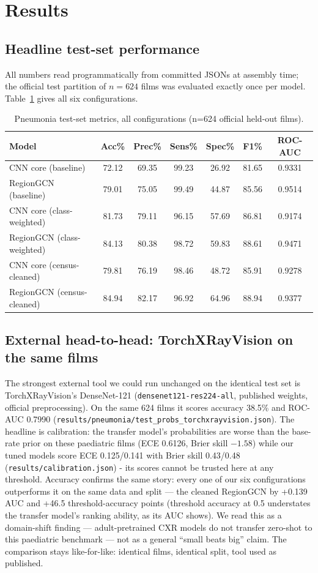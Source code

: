 
\section{Results}
\subsection{Headline test-set performance}
All numbers read programmatically from committed JSONs at assembly time;
the official test partition of $n=624$ films was evaluated
exactly once per model. Table~\ref{tab:pne-main} gives all six
configurations.
\begin{table}[h]\centering\small
\begin{tabular}{lcccccc}
\hline
Model & Acc\% & Prec\% & Sens\% & Spec\% & F1\% & ROC-AUC \\
\hline
CNN core (baseline) & 72.12 & 69.35 & 99.23 & 26.92 & 81.65 & 0.9331 \\
RegionGCN (baseline) & 79.01 & 75.05 & 99.49 & 44.87 & 85.56 & 0.9514 \\
CNN core (class-weighted) & 81.73 & 79.11 & 96.15 & 57.69 & 86.81 & 0.9174 \\
RegionGCN (class-weighted) & 84.13 & 80.38 & 98.72 & 59.83 & 88.61 & 0.9471 \\
CNN core (census-cleaned) & 79.81 & 76.19 & 98.46 & 48.72 & 85.91 & 0.9278 \\
RegionGCN (census-cleaned) & 84.94 & 82.17 & 96.92 & 64.96 & 88.94 & 0.9377 \\
\hline
\end{tabular}
\caption{Pneumonia test-set metrics, all configurations (n=624 official held-out films).}\label{tab:pne-main}
\end{table}

\subsection{External head-to-head: TorchXRayVision on the same films}
The strongest external tool we could run unchanged on the identical test
set is TorchXRayVision's DenseNet-121 (\texttt{densenet121-res224-all},
published weights, official preprocessing). On the same 624 films it scores
accuracy 38.5\% and ROC-AUC 0.7990
(\texttt{results/pneumonia/test\_probs\_torchxrayvision.json}). The headline is calibration: the transfer model's probabilities are worse than the base-rate prior on these paediatric films (ECE 0.6126, Brier skill $-1.58$) while our tuned models score ECE 0.125/0.141 with Brier skill 0.43/0.48 (\texttt{results/calibration.json}) - its scores cannot be trusted here at any threshold. Accuracy confirms the same story: every one of our six configurations outperforms it on the same data and split --- the cleaned RegionGCN by +0.139 AUC and +46.5 threshold-accuracy points (threshold accuracy at 0.5 understates the transfer model's ranking ability, as its AUC shows). We read this as a domain-shift finding --- adult-pretrained CXR models do not transfer zero-shot to this paediatric benchmark --- not as a general ``small beats big'' claim. The comparison stays like-for-like: identical films, identical split, tool used as published.
